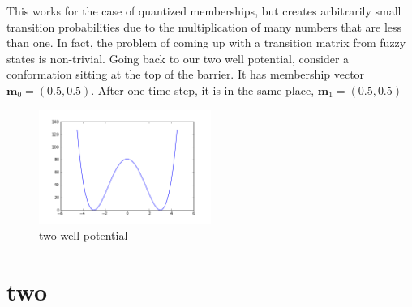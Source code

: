 \documentclass[10pt]{article}
\begin{document}
This works for the case of quantized memberships, but creates
arbitrarily small transition probabilities due to the multiplication
of many numbers that are less than one. In fact, the problem
of coming up with a transition matrix from fuzzy states is non-trivial.
Going back to our two well potential, consider a conformation sitting at
the top of the barrier. It has membership vector $\mathbf{m}_0 = (0.5,0.5)$. 
After one time step, it is in the same place, $\mathbf{m}_1 =(0.5, 0.5)$

\begin{figure}[h!]
	\centering
	\includegraphics[width=0.5\textwidth]{two-well.png}
	\caption{two well potential}
\end{figure}

\section{two}
\end{document}
